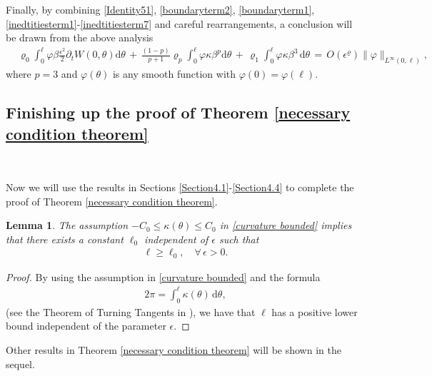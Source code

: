 \documentclass[10pt, reqno]{amsart}
\numberwithin{equation}{section}
\newtheorem{lemma}[theorem]{Lemma}
\theoremstyle{definition}
\begin{document}
{{\medskip
 Finally, by combining \eqref{Identity51}, \eqref{boundaryterm2}, \eqref{boundaryterm1}, \eqref{inedtitiesterm1}-\eqref{inedtitiesterm7} and careful rearrangements,
 a conclusion will be drawn from the above analysis
\begin{align}
 &\varrho_0
 \int_0^\ell \varphi\beta\frac{\epsilon^2}{2}\partial_t W(0, \theta) {\mathrm d}\theta
 \,+\,
 \frac{(1-p)}{p+1}\varrho_p
 \int_0^\ell \varphi\kappa\beta^p
 {\mathrm d}\theta
 \,+\,
 \varrho_1\int_0^\ell \varphi \kappa\beta^3\,{\mathrm d}\theta
 \,=\,
 O(\epsilon^\varrho)\|\varphi\|_{L^\infty(0,\ell)},
 \label{estimates-identiy3}
\end{align}
 where $p=3$ and $\varphi(\theta)$ is any smooth function with $\varphi(0)=\varphi(\ell)$.




\medskip
\subsection{ Finishing up the proof of Theorem \ref{necessary condition theorem}} \label{Section4.5}\


 Now we will use the results in Sections \ref{Section4.1}-\ref{Section4.4} to complete the proof of Theorem \ref{necessary condition theorem}.

\begin{lemma}\label{Lemma4.1}
 The assumption $-C_0\leq\kappa(\theta)\leq C_0$ in \eqref{curvature bounded} implies that
 there exists a constant $\ell_0$ independent of $\epsilon$ such that
\begin{align}
 \ell\geq\ell_0,\quad\forall\, \epsilon>0.
 \label{length-lower}
\end{align}
\end{lemma}

\begin{proof}
 By using the assumption in \eqref{curvature bounded} and the formula
\begin{align*} %
 2\pi=\int_0^{\ell} \kappa(\theta)\,{\mathrm d}\theta,
\end{align*}
 (see the Theorem of Turning Tangents in \cite{docarmo}),
 we have that $\ell$ has a positive lower bound independent of the parameter $\epsilon$.
\end{proof}


\medskip
 Other results in Theorem \ref{necessary condition theorem} will be shown in the sequel.

}}
\end{document}

